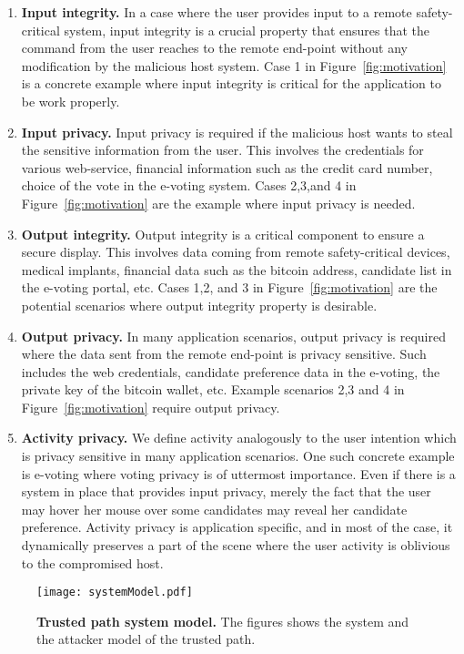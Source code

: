 \begin{enumerate}
  \item \textbf{Input integrity.} In a case where the user provides input to a remote safety-critical system, input integrity is a crucial property that ensures that the command from the user reaches to the remote end-point without any modification by the malicious host system. Case 1 in Figure~\ref{fig:motivation} is a concrete example where input integrity is critical for the application to be work properly.
  \item \textbf{Input privacy.}  Input privacy is required if the malicious host wants to steal the sensitive information from the user. This involves the credentials for various web-service, financial information such as the credit card number, choice of the vote in the e-voting system. Cases 2,3,and 4 in Figure~\ref{fig:motivation} are the example where input privacy is needed.
  \item \textbf{Output integrity.} Output integrity is a critical component to ensure a secure display. This involves data coming from remote safety-critical devices, medical implants, financial data such as the bitcoin address, candidate list in the e-voting portal, etc. Cases 1,2, and 3 in Figure~\ref{fig:motivation} are the potential scenarios where output integrity property is desirable.
  \item \textbf{Output privacy.} In many application scenarios, output privacy is required where the data sent from the remote end-point is privacy sensitive. Such includes the web credentials, candidate preference data in the e-voting, the private key of the bitcoin wallet, etc. Example scenarios 2,3 and 4 in Figure~\ref{fig:motivation} require output privacy.
  \item \textbf{Activity privacy.} We define activity analogously to the user intention which is privacy sensitive in many application scenarios. One such concrete example is e-voting where voting privacy is of uttermost importance. Even if there is a system in place that provides input privacy, merely the fact that the user may hover her mouse over some candidates may reveal her candidate preference. Activity privacy is application specific, and in most of the case, it dynamically preserves a part of the scene where the user activity is oblivious to the compromised host. 
\end{enumerate}

\begin{figure}[t]
\centering
\texttt{[image: systemModel.pdf]}
\caption{\textbf{Trusted path system model.} The figures shows the system and the attacker model of the trusted path.}
\label{fig:systemModel}
\centering
\end{figure}

